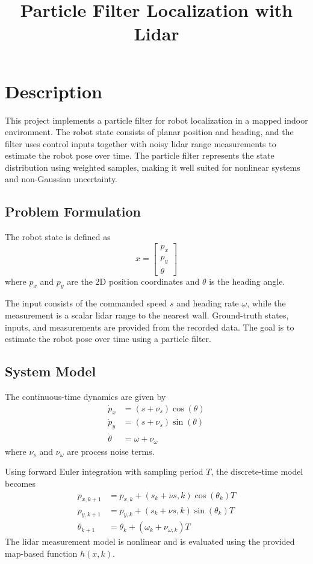 \documentclass[11pt, letterpaper, twocolumn]{article}
\title{Particle Filter Localization with Lidar}
\author{}
\date{}
\begin{document}
\maketitle

\section*{Description}

This project implements a particle filter for robot localization in a mapped
indoor environment. The robot state consists of planar position and heading, 
and the filter uses control inputs together with noisy lidar range measurements
to estimate the robot pose over time. The particle filter represents the state
distribution using weighted samples, making it well suited for nonlinear
systems and non-Gaussian uncertainty.

\subsection*{Problem Formulation}

The robot state is defined as
\[
x = \begin{bmatrix} p_x \\ p_y \\ \theta \end{bmatrix}
\]
where $p_x$ and $p_y$ are the 2D position coordinates and $\theta$ is the heading
angle.

The input consists of the commanded speed $s$ and heading rate $\omega$, while 
the measurement is a scalar lidar range to the nearest wall. Ground-truth states,
inputs, and measurements are provided from the recorded data. The goal is to 
estimate the robot pose over time using a particle filter.

\subsection*{System Model}

The continuous-time dynamics are given by 
\[\begin{aligned}
\dot{p}_x &= (s+\nu_s)\cos(\theta) \\
\dot{p}_y &= (s+\nu_s)\sin(\theta) \\
\dot{\theta} &= \omega + \nu_{\omega}
\end{aligned}
\]
where $\nu_s$ and $\nu_{\omega}$ are process noise terms.

Using forward Euler integration with sampling period $T$, the discrete-time model becomes
\[\begin{aligned}
p_{x,k+1} &= p_{x,k} + (s_k + \nu{s,k})\cos(\theta_k)T \\
p_{y,k+1} &= p_{y,k} + (s_k + \nu{s,k})\sin(\theta_k)T \\
\theta_{k+1} &= \theta_k + (\omega_k + \nu_{\omega, k})T
\end{aligned}
\]
The lidar measurement model is nonlinear and is evaluated using the provided map-based
function $h(x,k)$.
\end{document}
